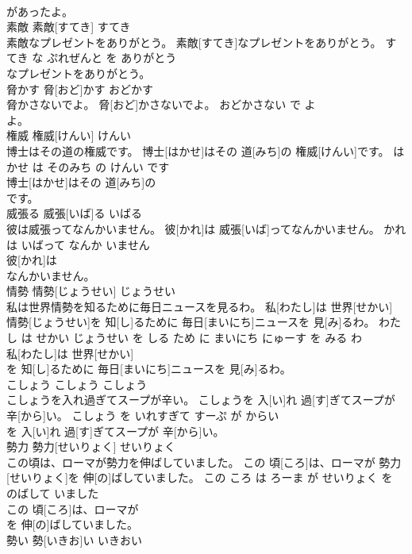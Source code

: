 \documentclass[8pt]{extreport}
\begin{document}
\begin{CJK}{UTF8}{min}
\\	があったよ。			
\\	素敵	素敵[すてき]	すてき	
\\	素敵なプレゼントをありがとう。	素敵[すてき]なプレゼントをありがとう。	すてき な ぷれぜんと を ありがとう	
\\	なプレゼントをありがとう。			
\\	脅かす	脅[おど]かす	おどかす	
\\	脅かさないでよ。	脅[おど]かさないでよ。	おどかさない で よ	
\\	よ。			
\\	権威	権威[けんい]	けんい	
\\	博士はその道の権威です。	博士[はかせ]はその 道[みち]の 権威[けんい]です。	はかせ は そのみち の けんい です	
\\	博士[はかせ]はその 道[みち]の
\\	です。			
\\	威張る	威張[いば]る	いばる	
\\	彼は威張ってなんかいません。	彼[かれ]は 威張[いば]ってなんかいません。	かれ は いばって なんか いません	
\\	彼[かれ]は
\\	なんかいません。			
\\	情勢	情勢[じょうせい]	じょうせい	
\\	私は世界情勢を知るために毎日ニュースを見るわ。	私[わたし]は 世界[せかい] 情勢[じょうせい]を 知[し]るために 毎日[まいにち]ニュースを 見[み]るわ。	わたし は せかい じょうせい を しる ため に まいにち にゅーす を みる わ	
\\	私[わたし]は 世界[せかい]
\\	を 知[し]るために 毎日[まいにち]ニュースを 見[み]るわ。			
\\	こしょう	こしょう	こしょう	
\\	こしょうを入れ過ぎてスープが辛い。	こしょうを 入[い]れ 過[す]ぎてスープが 辛[から]い。	こしょう を いれすぎて すーぷ が からい	
\\	を 入[い]れ 過[す]ぎてスープが 辛[から]い。			
\\	勢力	勢力[せいりょく]	せいりょく	
\\	この頃は、ローマが勢力を伸ばしていました。	この 頃[ころ]は、ローマが 勢力[せいりょく]を 伸[の]ばしていました。	この ころ は ろーま が せいりょく を のばして いました	
\\	この 頃[ころ]は、ローマが
\\	を 伸[の]ばしていました。			
\\	勢い	勢[いきお]い	いきおい	

\end{CJK}
\end{document}
